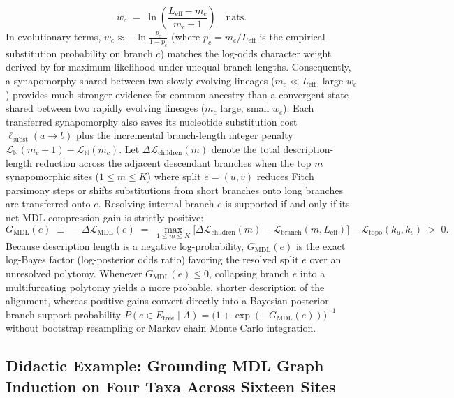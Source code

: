 \documentclass[11pt,a4paper]{article}
\begin{document}
\begin{equation}
    w_c \;=\; \ln\!\left(\frac{L_{\text{eff}} - m_c}{m_c + 1}\right) \quad \text{nats}.
    \label{eq:marginal_weight}
\end{equation}
In evolutionary terms, $w_c \approx -\ln\frac{p_c}{1 - p_c}$ (where $p_c = m_c / L_{\text{eff}}$ is the empirical substitution probability on branch $c$) matches the log-odds character weight derived by \citet{felsenstein1981evolutionary} for maximum likelihood under unequal branch lengths. Consequently, a synapomorphy shared between two slowly evolving lineages ($m_c \ll L_{\text{eff}}$, large $w_c$) provides much stronger evidence for common ancestry than a convergent state shared between two rapidly evolving lineages ($m_c$ large, small $w_c$). Each transferred synapomorphy also saves its nucleotide substitution cost $\ell_{\text{subst}}(a \to b)$ plus the incremental branch-length integer penalty $\mathcal{L}_{\mathbb{N}}(m_c + 1) - \mathcal{L}_{\mathbb{N}}(m_c)$. Let $\Delta\mathcal{L}_{\text{children}}(m)$ denote the total description-length reduction across the adjacent descendant branches when the top $m$ synapomorphic sites ($1 \le m \le K$) where split $e = (u,v)$ reduces Fitch parsimony steps \citep{fitch1971toward} or shifts substitutions from short branches onto long branches are transferred onto $e$. Resolving internal branch $e$ is supported if and only if its net MDL compression gain is strictly positive:
\begin{equation}
    G_{\text{MDL}}(e) \;\equiv\; -\Delta\mathcal{L}_{\text{MDL}}(e) \;=\; \max_{1 \le m \le K} \Big[ \Delta\mathcal{L}_{\text{children}}(m) - \mathcal{L}_{\text{branch}}(m, L_{\text{eff}}) \Big] - \mathcal{L}_{\text{topo}}(k_u, k_v) \;>\; 0.
    \label{eq:mdl_gain}
\end{equation}
Because description length is a negative log-probability, $G_{\text{MDL}}(e)$ is the exact log-Bayes factor (log-posterior odds ratio) favoring the resolved split $e$ over an unresolved polytomy. Whenever $G_{\text{MDL}}(e) \le 0$, collapsing branch $e$ into a multifurcating polytomy yields a more probable, shorter description of the alignment, whereas positive gains convert directly into a Bayesian posterior branch support probability $P(e \in E_{\text{tree}} \mid A) = \big(1 + \exp(-G_{\text{MDL}}(e))\big)^{-1}$ without bootstrap resampling or Markov chain Monte Carlo integration.

\subsection{Didactic Example: Grounding MDL Graph Induction on Four Taxa Across Sixteen Sites}
\end{document}
